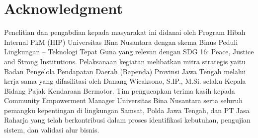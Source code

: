 \documentclass[conference]{IEEEtran}
\begin{document}
\section*{Acknowledgment}

Penelitian dan pengabdian kepada masyarakat ini didanai oleh Program Hibah Internal PkM (HIP)
Universitas Bina Nusantara dengan skema Binus Peduli Lingkungan -- Teknologi Tepat Guna
yang relevan dengan SDG 16: Peace, Justice and Strong Institutions. Pelaksanaan kegiatan
melibatkan mitra strategis yaitu Badan Pengelola Pendapatan Daerah (Bapenda) Provinsi
Jawa Tengah melalui kerja sama yang difasilitasi oleh Danang Wicaksono, S.IP., M.Si.
selaku Kepala Bidang Pajak Kendaraan Bermotor. Tim pengucapkan terima kasih kepada
Community Empowerment Manager Universitas Bina Nusantara serta seluruh pemangku kepentingan
di lingkungan Samsat, Polda Jawa Tengah, dan PT Jasa Raharja yang telah berkontribusi
dalam proses identifikasi kebutuhan, pengujian sistem, dan validasi alur bisnis.
\end{document}
